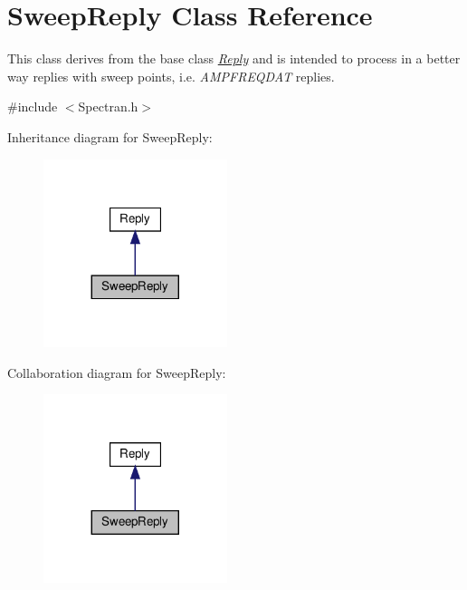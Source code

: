 \hypertarget{classSweepReply}{}\section{Sweep\+Reply Class Reference}
\label{classSweepReply}


This class derives from the base class {\itshape \hyperlink{classReply}{Reply}} and is intended to process in a better way replies with sweep points, i.\+e. {\itshape A\+M\+P\+F\+R\+E\+Q\+D\+AT} replies.  




{\ttfamily \#include $<$Spectran.\+h$>$}



Inheritance diagram for Sweep\+Reply\+:
\nopagebreak
\begin{figure}[H]
\begin{center}
\leavevmode
\includegraphics[width=152pt]{classSweepReply__inherit__graph}
\end{center}
\end{figure}


Collaboration diagram for Sweep\+Reply\+:
\nopagebreak
\begin{figure}[H]
\begin{center}
\leavevmode
\includegraphics[width=152pt]{classSweepReply__coll__graph}
\end{center}
\end{figure}
